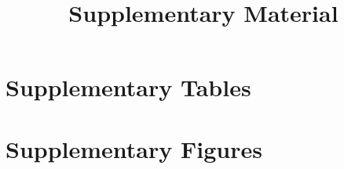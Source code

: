 \UseRawInputEncoding







\title{Supplementary Material}
\maketitle



\clearpage
\section*{Supplementary Tables}


\clearpage
\section*{Supplementary Figures}




